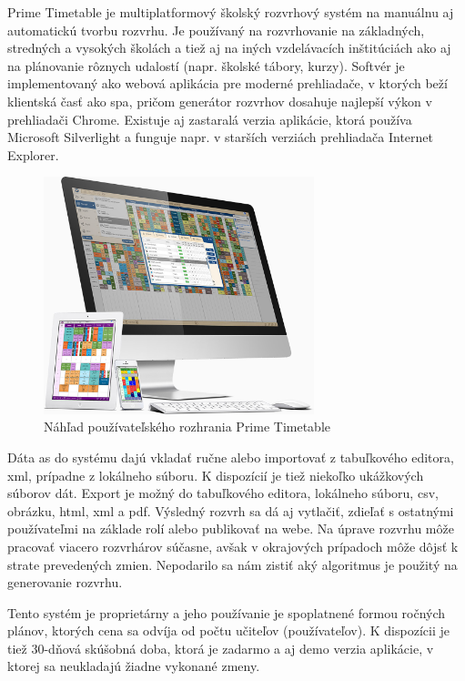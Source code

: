 Prime Timetable je multiplatformový školský rozvrhový systém na manuálnu aj
automatickú tvorbu rozvrhu. Je používaný na rozvrhovanie na základných,
stredných a vysokých školách a tiež aj na iných vzdelávacích inštitúciách ako aj
na plánovanie rôznych udalostí (napr. školské tábory, kurzy). Softvér je
implementovaný ako webová aplikácia pre moderné prehliadače, v ktorých beží
klientská časť ako \acrshort{spa}, pričom generátor rozvrhov dosahuje najlepší
výkon v prehliadači Chrome. Existuje aj zastaralá verzia aplikácie, ktorá
používa Microsoft Silverlight a funguje napr. v starších verziách prehliadača
Internet Explorer.

\begin{figure}
  \centering
  \includegraphics[width=0.7\textwidth]{figures/prime-timetable.jpg}
  \caption{\label{fig:prime-timetable} Náhľad používateľského
    rozhrania Prime Timetable \cite{prime_timetable}}
\end{figure}

Dáta as do systému dajú vkladať ručne alebo importovať z tabuľkového editora,
\acrshort{xml}, prípadne z lokálneho súboru. K dispozícií je tiež niekoľko
ukážkových súborov dát. Export je možný do tabuľkového editora, lokálneho
súboru, \acrshort{csv}, obrázku, \acrshort{html}, \acrshort{xml} a
\acrshort{pdf}. Výsledný rozvrh sa dá aj vytlačiť, zdieľať s ostatnými
používateľmi na základe rolí alebo publikovať na webe. Na úprave rozvrhu môže
pracovať viacero rozvrhárov súčasne, avšak v okrajových prípadoch môže dôjsť k
strate prevedených zmien. Nepodarilo sa nám zistiť aký algoritmus je použitý na
generovanie rozvrhu.

Tento systém je proprietárny a jeho používanie je spoplatnené formou ročných
plánov, ktorých cena sa odvíja od počtu učiteľov (používateľov). K dispozícii je
tiež 30-dňová skúšobná doba, ktorá je zadarmo a aj demo verzia aplikácie, v
ktorej sa neukladajú žiadne vykonané zmeny.

